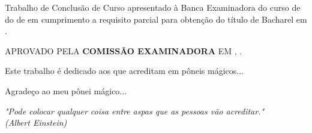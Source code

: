 \documentclass[12pt,openright,oneside,a4paper,english,french,spanish,brazil]{unifil}
\begin{document}
\begin{folhadeaprovacao}
	\begin{center}
		\ABNTEXchapterfont\textbf{\MakeTextUppercase{\imprimirautor}}
		\vspace*{2cm}
		\begin{center}
			\ABNTEXchapterfont\large\textbf{\MakeTextUppercase{\imprimirtitulo}}
		\end{center}
		\vspace*{2cm}
		Trabalho de Conclusão de Curso apresentado à Banca Examinadora do curso de \imprimirpreambulo do \imprimirinstituicao de \imprimirlocal em cumprimento a requisito parcial para obtenção do título de Bacharel em \imprimirpreambulo.
		\par
		\vspace*{.5in}
		\hspace{.6\textwidth}
		\begin{minipage}{.6\textwidth}
			\begin{center}
\MakeTextUppercase{Aprovado pela \textbf{COMISSÃO EXAMINADORA} em \imprimirlocal, \imprimirdata.}
			\end{center}
		\end{minipage}
			\vspace*{\fill}
	\end{center}
\end{folhadeaprovacao}


\begin{epigrafe}
\vspace*{\fill}
\begin{flushright}
Este trabalho é dedicado aos que acreditam em pôneis mágicos...
\end{flushright}
\end{epigrafe}


\begin{agradecimentos}

Agradeço ao meu pônei mágico...
\end{agradecimentos}



\begin{epigrafe}
\vspace*{\fill}
\begin{flushright}
\textit{"Pode colocar qualquer coisa entre aspas que as pessoas vão acreditar." \\
(Albert Einstein)}
\end{flushright}
\end{epigrafe}
\end{document}
